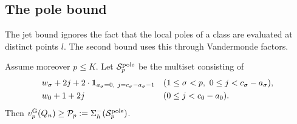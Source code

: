 \subsection{The pole bound}\label{sec:pole-bound}
The jet bound ignores the fact that the local poles of a class are evaluated at distinct points $l$. The second bound uses this through Vandermonde factors.

\begin{proposition}\label{prop:pole}
Assume moreover $p\le K$. Let $\mathcal{S}^{\mathrm{pole}}_p$ be the multiset consisting of
\begin{align*}
&w_\sigma+2j+2\cdot\ind_{a_\sigma=0,\ j=c_\sigma-a_\sigma-1}&&(1\le\sigma<p,\ 0\le j<c_\sigma-a_\sigma),\\
&w_0+1+2j&&(0\le j<c_0-a_0).
\end{align*}
Then $v^{\mathrm{G}}_{p}(Q_n)\ge\mathcal{P}_p:=\Sigma^-_h(\mathcal{S}^{\mathrm{pole}}_p)$.
\end{proposition}

